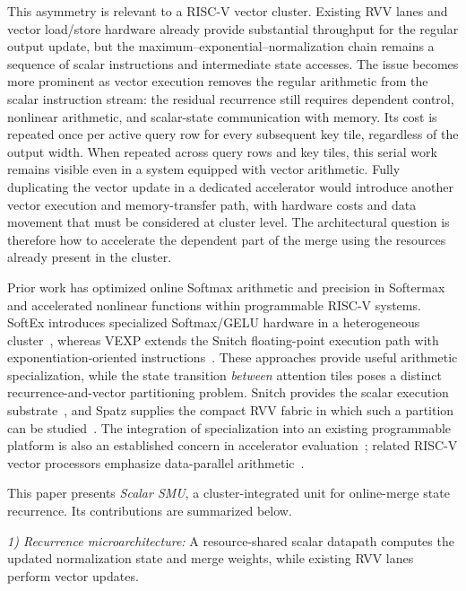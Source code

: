 \documentclass[journal]{IEEEtran}
\begin{document}
This asymmetry is relevant to a RISC-V vector cluster. Existing RVV lanes and
vector load/store hardware already provide substantial throughput for the
regular output update, but the maximum--exponential--normalization chain
remains a sequence of scalar instructions and intermediate state accesses.
The issue becomes more prominent as vector execution removes the regular
arithmetic from the scalar instruction stream: the residual recurrence
still requires dependent control, nonlinear arithmetic, and scalar-state
communication with memory. Its cost is repeated once per active query
row for every subsequent key tile, regardless of the output width.
When repeated across query rows and key tiles, this serial work remains
visible even in a system equipped with vector arithmetic. Fully duplicating
the vector update in a dedicated accelerator would introduce another vector
execution and memory-transfer path, with hardware costs and data movement
that must be considered at cluster level. The architectural question is
therefore how to accelerate the dependent part of the merge using the
resources already present in the cluster.

Prior work has optimized online Softmax arithmetic and precision in
Softermax~\cite{stevens2021softermax} and accelerated nonlinear functions
within programmable RISC-V systems. SoftEx introduces specialized
Softmax/GELU hardware in a heterogeneous cluster~\cite{belano2025softex},
whereas VEXP extends the Snitch floating-point execution path with
exponentiation-oriented instructions~\cite{wang2025vexp}. These approaches
provide useful arithmetic specialization, while the state transition
\emph{between} attention tiles poses a distinct recurrence-and-vector
partitioning problem. Snitch provides the scalar execution substrate~\cite{zaruba2021snitch},
and Spatz supplies the compact RVV fabric in which such a partition can be
studied~\cite{Spatz2025}. The integration of specialization into an
existing programmable platform is also an established concern in
accelerator evaluation~\cite{genc2021gemmini}; related RISC-V vector
processors emphasize data-parallel arithmetic~\cite{cavalcante2020ara}.

This paper presents \emph{Scalar SMU}, a cluster-integrated unit for
online-merge state recurrence. Its contributions are summarized below.

\noindent\emph{1) Recurrence microarchitecture:}
A resource-shared scalar datapath computes the updated normalization state
and merge weights, while existing RVV lanes perform vector updates.
\end{document}
